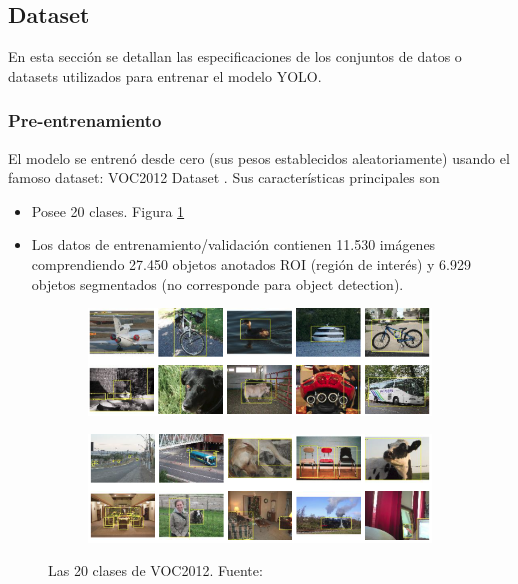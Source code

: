 \label{Dataset}
\subsection{Dataset}
En esta sección se detallan las especificaciones de los conjuntos de datos o datasets utilizados para entrenar el modelo YOLO.

\subsubsection{Pre-entrenamiento}
El modelo se entrenó desde cero (sus pesos establecidos aleatoriamente) usando el famoso dataset: VOC2012 Dataset \cite{voc2012}. Sus características principales son

\begin{itemize}
    \item Posee 20 clases. Figura \ref{fig:pascal-voc}
    \item Los datos de entrenamiento/validación contienen 11.530 imágenes comprendiendo 27.450 objetos anotados ROI (región de interés) y 6.929 objetos segmentados (no corresponde para object detection).
\end{itemize}

\begin{figure}[h!]
    \centering
    \begin{subfigure}[h]{\textwidth}
        \centering
        \includegraphics[width=\linewidth]{img/pascal-voc-20-classes-part1.png}
    \end{subfigure}
    \begin{subfigure}[h]{\textwidth}
        \centering
        \includegraphics[width=\linewidth]{img/pascal-voc-20-classes-part2.png}
    \end{subfigure}
    \caption{Las 20 clases de VOC2012. Fuente: \cite{voc2012}}
    \label{fig:pascal-voc}
\end{figure}

